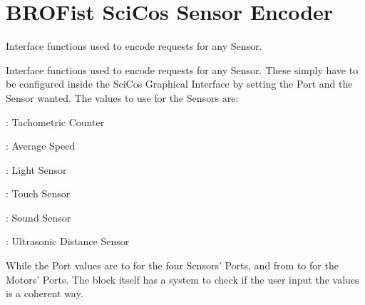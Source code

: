 \hypertarget{group___b_r_o_cos_sens_enc}{
\section{BROFist SciCos Sensor Encoder}
\label{group___b_r_o_cos_sens_enc}
}


Interface functions used to encode requests for any Sensor.  


Interface functions used to encode requests for any Sensor. These simply have to be configured inside the SciCos Graphical Interface by setting the Port and the Sensor wanted. The values to use for the Sensors are:
\begin{DoxyItemize}
\item : Tachometric Counter
\item : Average Speed
\item : Light Sensor
\item : Touch Sensor
\item : Sound Sensor
\item : Ultrasonic Distance Sensor
\end{DoxyItemize}

While the Port values are  to  for the four Sensors' Ports, and from  to  for the Motors' Ports. The block itself has a system to check if the user input the values is a coherent way. 
